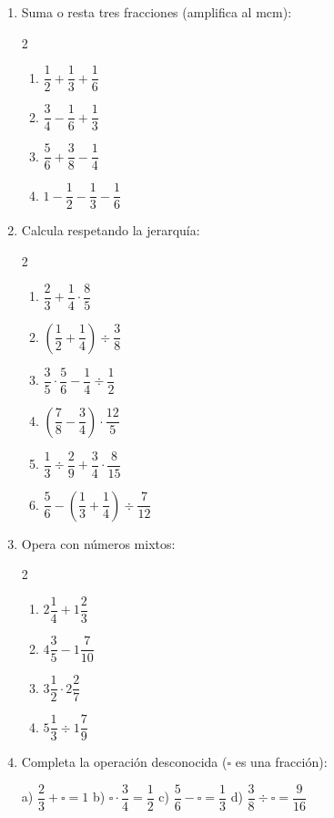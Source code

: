 \documentclass[11pt, letterpaper]{article}
\begin{document}
\begin{enumerate}[label=\textbf{\arabic*.}, leftmargin=*, resume]

\item Suma o resta tres fracciones (amplifica al mcm):
\begin{multicols}{2}
\begin{enumerate}[label=\alph*)]
  \item $\dfrac{1}{2}+\dfrac{1}{3}+\dfrac{1}{6}$
  \item $\dfrac{3}{4}-\dfrac{1}{6}+\dfrac{1}{3}$
  \item $\dfrac{5}{6}+\dfrac{3}{8}-\dfrac{1}{4}$
  \item $1-\dfrac{1}{2}-\dfrac{1}{3}-\dfrac{1}{6}$
\end{enumerate}
\end{multicols}

\item Calcula respetando la jerarqu\'ia:
\begin{multicols}{2}
\begin{enumerate}[label=\alph*)]
  \item $\dfrac{2}{3}+\dfrac{1}{4}\cdot\dfrac{8}{5}$
  \item $\left(\dfrac{1}{2}+\dfrac{1}{4}\right)\div\dfrac{3}{8}$
  \item $\dfrac{3}{5}\cdot\dfrac{5}{6}-\dfrac{1}{4}\div\dfrac{1}{2}$
  \item $\left(\dfrac{7}{8}-\dfrac{3}{4}\right)\cdot\dfrac{12}{5}$
  \item $\dfrac{1}{3}\div\dfrac{2}{9}+\dfrac{3}{4}\cdot\dfrac{8}{15}$
  \item $\dfrac{5}{6}-\left(\dfrac{1}{3}+\dfrac{1}{4}\right)\div\dfrac{7}{12}$
\end{enumerate}
\end{multicols}

\item Opera con n\'umeros mixtos:
\begin{multicols}{2}
\begin{enumerate}[label=\alph*)]
  \item $2\dfrac{1}{4}+1\dfrac{2}{3}$
  \item $4\dfrac{3}{5}-1\dfrac{7}{10}$
  \item $3\dfrac{1}{2}\cdot2\dfrac{2}{7}$
  \item $5\dfrac{1}{3}\div1\dfrac{7}{9}$
\end{enumerate}
\end{multicols}

\item Completa la operaci\'on desconocida ($\square$ es una fracci\'on):

\noindent a)\; $\dfrac{2}{3}+\square=1$ \quad b)\; $\square\cdot\dfrac{3}{4}=\dfrac{1}{2}$ \quad c)\; $\dfrac{5}{6}-\square=\dfrac{1}{3}$ \quad d)\; $\dfrac{3}{8}\div\square=\dfrac{9}{16}$

\end{enumerate}
\end{document}
